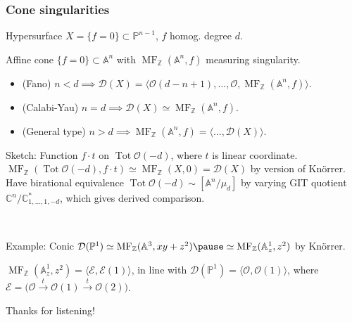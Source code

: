 \documentclass{beamer}
\DeclareMathOperator{\Tot}{Tot}
\DeclareMathOperator{\MF}{MF}
\newcommand{\A}{\mathbb{A}}
\newcommand{\C}{\mathbb{C}}
\newcommand{\Z}{\mathbb{Z}}
\renewcommand{\P}{\mathbb{P}}
\renewcommand{\O}{\mathcal{O}}
\newcommand{\calD}{\mathcal{D}}
\newcommand{\calE}{\mathcal{E}}
\begin{document}
\begin{frame}
    \frametitle{Cone singularities}

    Hypersurface $X=\{f=0\}\subset\P^{n-1}$, $f$ homog. degree $d$. \pause

    Affine cone $\{f=0\}\subset\A^n$ with $\MF_\Z(\A^n,f)$ measuring
    singularity. \pause
    \begin{theorem}[Orlov]
        \begin{itemize}
            \item (Fano) $n<d\implies
                \calD(X)=\langle\O(d-n+1),\ldots,\O,\MF_\Z(\A^n,f)\rangle$.
            \item (Calabi-Yau) $n=d \implies
                \calD(X)\simeq\MF_\Z(\A^n,f)$.
            \item (General type) $n>d \implies
                \MF_\Z(\A^n,f)=\langle\ldots,\calD(X)\rangle$.
        \end{itemize}
    \end{theorem} \pause

    Sketch: Function $f\cdot t$ on $\Tot\O(-d)$, where $t$ is linear coordinate.
    \pause $\MF_\Z(\Tot\O(-d),f\cdot t)\simeq\MF_\Z(X,0)=\calD(X)$ by
    version of Kn\"orrer. \pause Have birational equivalence
    $\Tot\O(-d)\sim[\A^n/\mu_d]$ by varying GIT quotient
    $\C^n/\C^*_{1,\ldots,1,-d}$, which gives derived comparison. \pause


    ~

    Example: Conic $\calD(\P^1)\simeq\MF_\Z(\A^3,xy+z^2) \pause
    \simeq\MF_\Z(\A^1_z,z^2)$ by Kn\"orrer. \pause

    $\MF_\Z(\A^1_z,z^2)=\langle\calE,\calE(1)\rangle$,
    in line with $\calD(\P^1)=\langle\O,\O(1)\rangle$, where
    $\calE=\bigl(\O\xrightarrow{t}\O(1)\xrightarrow{t}\O(2)\bigr)$.
\end{frame}

\begin{frame}
    Thanks for listening!
\end{frame}
\end{document}
